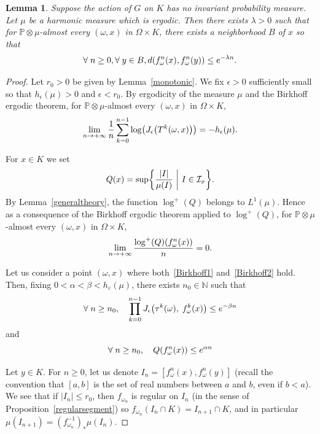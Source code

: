 \documentclass[10pt]{amsart}
\newtheorem{lemm}[theo]{Lemma}\newtheorem{prop}[theo]{Proposition}\newtheorem{coro}[theo]{Corollary}\newtheorem{conj}[theo]{Conjecture}
\theoremstyle{definition}\newtheorem{defi}[theo]{Definition}\newtheorem{rema}[theo]{Remark}\newtheorem{exam}[theo]{Example}\newtheorem{exem}[theo]{Example}\newtheorem{nota}[theo]{Notation}
\newcommand{\bbP}{\mathbb{P}}
\newcommand{\clI}{\mathcal{I}}
\newcommand{\N}{\mathbb{N}}
\newcommand{\ep}{\varepsilon}
\renewcommand*{\to}{\mathchoice{\longrightarrow}{\rightarrow}{\rightarrow}{\rightarrow}}
\let\originalleft\left
\let\originalright\right
\renewcommand{\left}{\mathopen{}\mathclose\bgroup\originalleft}
\renewcommand{\right}{\aftergroup\egroup\originalright}
\let\oldforall\forall
\renewcommand*{\forall}{\mathrel{\oldforall}}
\begin{document}
\begin{lemm}\label{localcontrae}
Suppose the action of $G$ on $K$ has no invariant probability measure. Let $\mu$ be a harmonic measure which is ergodic. Then there exists $\lambda>0$ such that for $\bbP\otimes\mu$-almost every $(\omega,x)$ in $\Omega\times K$, there exists a neighborhood $B$ of $x$ so that
\[
\forall n \geq 0,\forall y\in B, d\left(f_\omega^n(x),f_\omega^n(y)\right) \leq e^{-\lambda n}.
\]
\end{lemm}
\begin{proof}
Let $r_0 >0$ be given by Lemma~\ref{monotonic}. We fix $\epsilon >0$ sufficiently small so that $h_{\epsilon}(\mu) >0$ and $\epsilon<r_0$. By ergodicity of the measure $\mu$ and the Birkhoff ergodic theorem, for $\bbP \otimes \mu$-almost every $(\omega,x)$ in $\Omega \times K$,
\begin{equation}\label{Birkhoff1}
\lim_{n \to + \infty} \frac{1}{n} \sum_{k=0}^{n-1} \log\left(J_{\epsilon}\left(T^{k}(\omega,x)\right)\right)=- h_{\epsilon}(\mu).
\end{equation}

For $x \in K$ we set
\[
Q(x)= \sup \left\{ \frac{|I|}{\mu(I)} \ \middle| \ I \in \clI_{x} \right\}.
\]
By Lemma~\ref{generaltheory}, the function $\log^{+}(Q)$ belongs to $L^{1}(\mu)$. Hence as a consequence of the Birkhoff ergodic theorem applied to $\log^{+}(Q)$, for $\bbP \otimes \mu$-almost every $(\omega,x)$ in $\Omega \times K$,
\begin{equation}\label{Birkhoff2}
\lim_{n \to + \infty} \frac{\log^{+}(Q)(f_{\omega}^{n}(x))}{n}=0.
\end{equation}

Let us consider a point $(\omega,x)$ where both~\eqref{Birkhoff1} and~\eqref{Birkhoff2} hold. Then, fixing $0<\alpha<\beta<h_\ep(\mu)$, there exists $n_0\in\N$ such that
\begin{equation}\label{bound1}
\forall n \geq n_0, \quad \prod_{k=0}^{n-1} J_{\epsilon}\left(\tau^{k}(\omega),\;f_{\omega}^{k}(x)\right) \leq e^{- \beta n}
\end{equation}
and
\begin{equation}\label{bound2}
\forall n \geq n_0,\quad Q\left(f_\omega^n(x)\right)\leq e^{\alpha n}
\end{equation}

Let $y \in K$. For $n\geq 0$, let us denote $I_n=[f_\omega^n(x),f_\omega^n(y)]$ (recall the convention that $[a,b]$ is the set of real numbers between $a$ and $b$, even if $b<a$). We see that if $|I_n|\leq r_0$, then $f_{\omega_n}$ is regular on $I_n$ (in the sense of Proposition~\ref{regularsegment}) so $f_{\omega_n}(I_n\cap K)=I_{n+1}\cap K$, and in particular $\mu(I_{n+1})=(f_{\omega_n}^{-1})_*\mu(I_n)$.


\end{proof}
\end{document}
